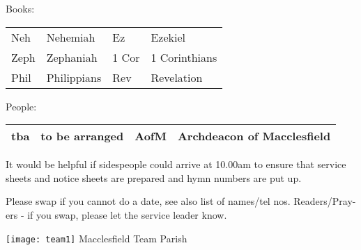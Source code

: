 \documentclass[10pt]{article}
\newif\ifpdf
\begin{document}
\begin{center}
\vspace{1em}
Books: \begin{tabular}{|l|l|l|l|} \hline
Neh & Nehemiah &
Ez & Ezekiel\\
Zeph & Zephaniah &
1 Cor & 1 Corinthians\\
Phil & Philippians &
Rev & Revelation \\ \hline
\end{tabular}
People: \begin{tabular}{|c|c|c|c|}\hline
 tba & to be arranged & AofM &  Archdeacon of Macclesfield \\
     \hline
  \end{tabular}
\end{center}
\begin{minipage}{0.7\textwidth}
\begin{changebar} 
It would be helpful if sidespeople 
could arrive at 10.00am to ensure that service sheets and notice sheets are 
prepared and hymn numbers are put up.
\end{changebar}

Please swap if you cannot do a date, see also list of names/tel nos.
Readers/Pray-ers - if you swap, please let the service leader know.
\end{minipage}
\begin{minipage}{0.3\textwidth}
\ifpdf
\fbox{
\texttt{[image: team1]} Macclesfield Team Parish
}
\else
\hspace{2em}
\texttt{[image: team1]} Macclesfield Team Parish
\fi
\end{minipage}
\end{document}
